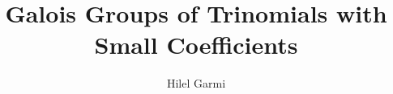 \documentclass[oneside, 11pt]{article}
\begin{document}
  \title{
    Galois Groups of Trinomials with Small Coefficients
  }
  \author{Hilel Garmi}
  \date{}
  \maketitle
  
  
  
  
  

  
  
\end{document}
